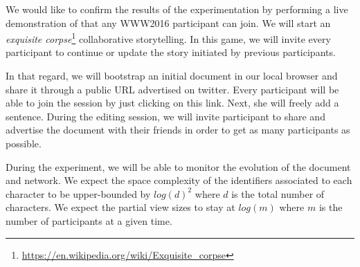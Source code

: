 We would like to confirm the results of the experimentation by performing a live
demonstration of \CRATE that any WWW2016 participant can join. We will start an
\emph{exquisite
  corpse}\footnote{\url{https://en.wikipedia.org/wiki/Exquisite_corpse}}
collaborative storytelling. In this game, we will invite every participant to
continue or update the story initiated by previous participants.

In that regard, we will bootstrap an initial document in our local browser and
share it through a public URL advertised on twitter. Every participant will be
able to join the session by just clicking on this link. Next, she will freely
add a sentence. During the editing session, we will invite participant to share
and advertise the document with their friends in order to get as many
participants as possible.

During the experiment, we will be able to monitor the evolution of the document
and network. We expect the space complexity of the identifiers associated to
each character to be upper-bounded by $log(d)^2$ where $d$ is the total number
of characters. We expect the partial view sizes to stay at $log(m)$ where
$m$ is the number of participants at a given time.
 

